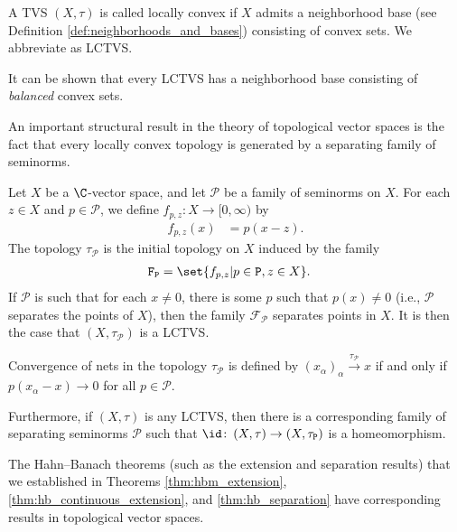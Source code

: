 \begin{definition}\label{def:lctvs}
A TVS $\left(X,\tau\right)$ is called locally convex if $X$ admits a neighborhood base (see Definition \ref{def:neighborhoods_and_bases}) consisting of convex sets. We abbreviate as LCTVS.\newline

It can be shown that every LCTVS has a neighborhood base consisting of \textit{balanced} convex sets.
\end{definition}
An important structural result in the theory of topological vector spaces is the fact that every locally convex topology is generated by a separating family of seminorms.
\begin{proposition}\label{prop:structure_of_lctvs}
  Let $X$ be a $\C$-vector space, and let $\mathcal{P}$ be a family of seminorms on $X$. For each $z\in X$ and $p\in \mathcal{P}$, we define $f_{p,z}\colon X\rightarrow [0,\infty)$ by
  \begin{align*}
    f_{p,z}(x) &= p\left(x-z\right).
  \end{align*}
  The topology $\tau_{\mathcal{P}}$ is the initial topology on $X$ induced by the family
  \begin{align*}
    \mathcal{F}_{\mathcal{P}} &= \set{f_{p,z} | p\in \mathcal{P},z\in X}.
  \end{align*}
  If $\mathcal{P}$ is such that for each $x\neq 0$, there is some $p$ such that $p(x)\neq 0$ (i.e., $\mathcal{P}$ separates the points of $X$), then the family $\mathcal{F}_{\mathcal{P}}$ separates points in $X$. It is then the case that $\left(X,\tau_{\mathcal{P}}\right)$ is a LCTVS.\newline

  Convergence of nets in the topology $\tau_{\mathcal{P}}$ is defined by $\left(x_{\alpha}\right)_{\alpha}\xrightarrow{\tau_{\mathcal{P}}}x$ if and only if $p\left(x_{\alpha}-x\right)\rightarrow 0$ for all $p\in \mathcal{P}$.\newline

  Furthermore, if $\left(X,\tau\right)$ is any LCTVS, then there is a corresponding family of separating seminorms $\mathcal{P}$ such that $\id\colon\left(X,\tau\right)\rightarrow \left(X,\tau_{\mathcal{P}}\right)$ is a homeomorphism.
\end{proposition}
The Hahn--Banach theorems (such as the extension and separation results) that we established in Theorems \ref{thm:hbm_extension}, \ref{thm:hb_continuous_extension}, and \ref{thm:hb_separation} have corresponding results in topological vector spaces.
